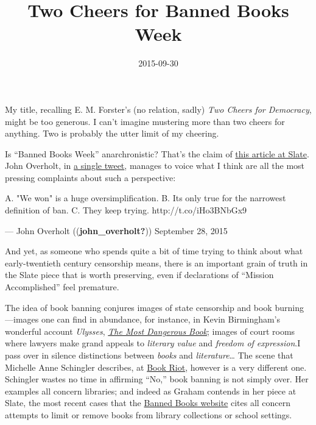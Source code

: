 \documentclass[
  12pt,
]{article}
\title{Two Cheers for Banned Books Week}
\author{}
\date{2015-09-30}
\begin{document}
{My title, recalling E. M. Forster's (no relation, sadly) \emph{Two
Cheers for Democracy}, might be too generous. I can't imagine mustering
more than two cheers for anything. Two is probably the utter limit of my
cheering.}

Is ``Banned Books Week'' anarchronistic? That's the claim of
\href{http://www.slate.com/articles/arts/culturebox/2015/09/banned_books_week_no_one_bans_books_anymore_and_censorship_of_books_is_incredibly.single.html}{this
article at Slate}. John Overholt, in
\href{https://twitter.com/john_overholt/status/648471105204830208}{a
single tweet}, manages to voice what I think are all the most pressing
complaints about such a perspective:

A. "We won" is a huge oversimplification.
B. It\textquotesingle s only true for the narrowest definition of ban.
C. They keep trying. http://t.co/iHo3BNbGx9

--- John Overholt ((\textbf{john\_overholt?})) September 28, 2015

And yet, as someone who spends quite a bit of time trying to think about
what early-twentieth century censorship means, there is an important
grain of truth in the Slate piece that is worth preserving, even if
declarations of ``Mission Accomplished'' feel premature.

The idea of book banning conjures images of state censorship and book
burning---images one can find in abundance, for instance, in Kevin
Birmingham's wonderful account \emph{Ulysses},
\href{http://www.nybooks.com/articles/archives/2015/apr/23/ulysses-its-still-scandal/}{\emph{The
Most Dangerous Book}}; images of court rooms where lawyers make grand
appeals to \emph{literary value} and \emph{freedom of expression}.{I
pass over in silence distinctions between \emph{books} and
\emph{literature}\ldots{}} The scene that Michelle Anne Schingler
describes, at
\href{http://bookriot.com/2015/09/29/hey-slate-banned-books-week-isnt-crock/}{Book
Riot}, however is a very different one. Schingler wastes no time in
affirming ``No,'' book banning is not simply over. Her examples all
concern libraries; and indeed as Graham contends in her piece at Slate,
the most recent cases that the
\href{http://www.bannedbooksweek.org/about}{Banned Books website} cites
all concern attempts to limit or remove books from library collections
or school settings.
\end{document}

